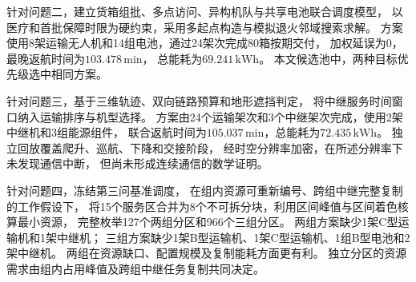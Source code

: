 针对问题二，建立货箱组批、多点访问、异构机队与共享电池联合调度模型，
以医疗和首批保障时限为硬约束，采用多起点构造与模拟退火邻域搜索求解。
方案使用8架运输无人机和14组电池，通过24架次完成80箱按期交付，
加权延误为0，最晚返航时间为$103.478\,\mathrm{min}$，
总能耗为$69.241\,\mathrm{kWh}$。
本文候选池中，两种目标优先级选中相同方案。

针对问题三，基于三维轨迹、双向链路预算和地形遮挡判定，
将中继服务时间窗口纳入运输排序与机型选择。
方案由24个运输架次和3个中继架次完成，使用2架中继机和3组能源组件，
联合返航时间为$105.037\,\mathrm{min}$，总能耗为$72.435\,\mathrm{kWh}$。
独立回放覆盖爬升、巡航、下降和交接阶段，
经时空分辨率加密，在所述分辨率下未发现通信中断，
但尚未形成连续通信的数学证明。

针对问题四，冻结第三问基准调度，
在组内资源可重新编号、跨组中继完整复制的工作假设下，
将15个服务区合并为8个不可拆分块，利用区间峰值与区间着色核算最小资源，
完整枚举127个两组分区和966个三组分区。
两组方案缺少1架C型运输机和1架中继机；
三组方案缺少1架B型运输机、1架C型运输机、1组B型电池和2架中继机。
两组在资源缺口、配置规模及复制能耗方面更有利。
独立分区的资源需求由组内占用峰值及跨组中继任务复制共同决定。
